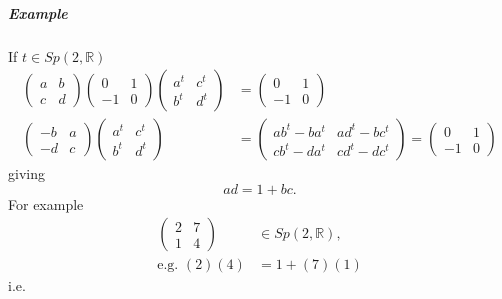 \documentclass[aps,preprint]{revtex4}
\begin{document}
\subparagraph{Example}

If $t\in Sp\left( 2,\mathbb{R}\right) $%
\begin{align}
\left( 
\begin{array}{cc}
a & b \\ 
c & d%
\end{array}%
\right) \left( 
\begin{array}{cc}
0 & 1 \\ 
-1 & 0%
\end{array}%
\right) \left( 
\begin{array}{cc}
a^{t} & c^{t} \\ 
b^{t} & d^{t}%
\end{array}%
\right) & =\left( 
\begin{array}{cc}
0 & 1 \\ 
-1 & 0%
\end{array}%
\right) \\
\left( 
\begin{array}{cc}
-b & a \\ 
-d & c%
\end{array}%
\right) \left( 
\begin{array}{cc}
a^{t} & c^{t} \\ 
b^{t} & d^{t}%
\end{array}%
\right) & =\left( 
\begin{array}{cc}
ab^{t}-ba^{t} & ad^{t}-bc^{t} \\ 
cb^{t}-da^{t} & cd^{t}-dc^{t}%
\end{array}%
\right) =\left( 
\begin{array}{cc}
0 & 1 \\ 
-1 & 0%
\end{array}%
\right)
\end{align}%
giving 
\begin{equation}
ad=1+bc.
\end{equation}%
For example 
\begin{align}
\left( 
\begin{array}{cc}
2 & 7 \\ 
1 & 4%
\end{array}%
\right) & \in Sp\left( 2,\mathbb{R}\right) , \\
\text{e.g. }\left( 2\right) \left( 4\right) & =1+\left( 7\right) \left(
1\right)
\end{align}%
i.e. 
\end{document}
